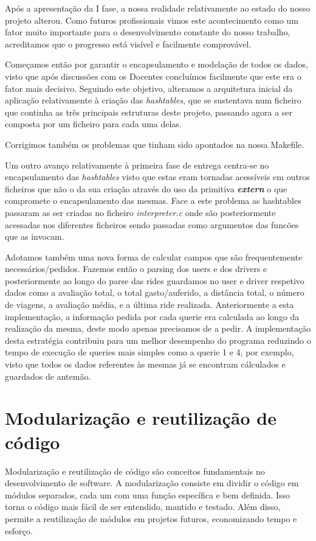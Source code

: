 \documentclass[12pt,a4paper]{article}
\begin{document}
    \par Após a apresentação da I fase, a nossa realidade relativamente ao estado do nosso projeto alterou. Como futuros profissionais vimos este acontecimento como um fator muito importante para o desenvolvimento constante do nosso trabalho, acreditamos que o progresso está visível e facilmente comprovável.
    \par Começamos então por garantir o encapsulamento e modelação de todos os dados, visto que após discussões com os Docentes concluímos facilmente que este era o fator mais decisivo. Seguindo este objetivo, alteramos a arquitetura inicial da aplicação relativamente à criação das \textit{hashtables}, que se sustentava num ficheiro que continha as três principais estruturas deste projeto, passando agora a ser composta por um ficheiro para cada uma delas.
    \par Corrigimos também os problemas que tinham sido apontados na nossa Makefile.
    \par Um outro avanço relativamente à primeira fase de entrega centra-se no encapsulamento das \textit{hashtables} visto que estas eram tornadas acessíveis em outros ficheiros que não o da sua criação através do uso da primitiva \textit{\textbf{extern}} o que compromete o encapsulamento das mesmas. Face a este problema as hashtables passaram as ser criadas no ficheiro \textit{interpreter.c} onde são posteriormente acessadas nos diferentes ficheiros sendo passadas como argumentos das funcões que as invocam.
    \par Adotamos também uma nova forma de calcular campos que são frequentemente necessários/pedidos. Fazemos então o parsing dos users e dos drivers e posteriormente ao longo do parse das rides guardamos no user e driver respetivo dados como a avaliação total, o total gasto/auferido, a distância total, o número de viagens, a avaliação média, e a última ride realizada. Anteriormente a esta implementação, a informação pedida por cada querie era calculada ao longo da realização da mesma, deste modo apenas precisamos de a pedir. A implementação desta estratégia contribuiu para um melhor desempenho do programa reduzindo o tempo de execução de queries mais simples como a querie 1 e 4, por exemplo, visto que todos os dados referentes às mesmas já se encontram cálculados e guardados de antemão.
    
 \clearpage
 
\section{Modularização e reutilização de código}
    \par Modularização e reutilização de código são conceitos fundamentais no desenvolvimento de software. A modularização consiste em dividir o código em módulos separados, cada um com uma função específica e bem definida. Isso torna o código mais fácil de ser entendido, mantido e testado. Além disso, permite a reutilização de módulos em projetos futuros, economizando tempo e esforço.
\end{document}

